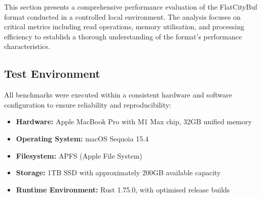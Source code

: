 This section presents a comprehensive performance evaluation of the FlatCityBuf format conducted in a controlled local environment. The analysis focuses on critical metrics including read operations, memory utilisation, and processing efficiency to establish a thorough understanding of the format's performance characteristics.

\subsection{Test Environment}
\label{result:benchmark_on_local_environment:test_environment}

All benchmarks were executed within a consistent hardware and software configuration to ensure reliability and reproducibility:

\begin{itemize}
  \item \textbf{Hardware:} Apple MacBook Pro with M1 Max chip, 32GB unified memory
  \item \textbf{Operating System:} macOS Sequoia 15.4
  \item \textbf{Filesystem:} APFS (Apple File System)
  \item \textbf{Storage:} 1TB SSD with approximately 200GB available capacity
  \item \textbf{Runtime Environment:} Rust 1.75.0, with optimised release builds
\end{itemize}






